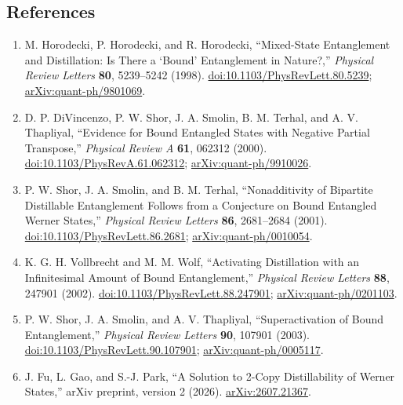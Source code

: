 \subsection*{References}

\begin{enumerate}[label={},leftmargin=4.8em,labelsep=0.5em]
  \footnotesize
  \item[\textup{[HHH98]}]\label{ref:05aa-horodecki}
  M. Horodecki, P. Horodecki, and R. Horodecki, ``Mixed-State Entanglement and Distillation: Is There a `Bound' Entanglement in Nature?,'' \emph{Physical Review Letters} \textbf{80}, 5239--5242 (1998). \href{https://doi.org/10.1103/PhysRevLett.80.5239}{doi:10.1103/PhysRevLett.80.5239}; \href{https://arxiv.org/abs/quant-ph/9801069}{arXiv:quant-ph/9801069}.

  \item[\textup{[DSS+00]}]\label{ref:05aa-divincenzo-et-al}
  D. P. DiVincenzo, P. W. Shor, J. A. Smolin, B. M. Terhal, and A. V. Thapliyal, ``Evidence for Bound Entangled States with Negative Partial Transpose,'' \emph{Physical Review A} \textbf{61}, 062312 (2000). \href{https://doi.org/10.1103/PhysRevA.61.062312}{doi:10.1103/PhysRevA.61.062312}; \href{https://arxiv.org/abs/quant-ph/9910026}{arXiv:quant-ph/9910026}.

  \item[\textup{[SST01]}]\label{ref:05aa-shor-smolin-terhal}
  P. W. Shor, J. A. Smolin, and B. M. Terhal, ``Nonadditivity of Bipartite Distillable Entanglement Follows from a Conjecture on Bound Entangled Werner States,'' \emph{Physical Review Letters} \textbf{86}, 2681--2684 (2001). \href{https://doi.org/10.1103/PhysRevLett.86.2681}{doi:10.1103/PhysRevLett.86.2681}; \href{https://arxiv.org/abs/quant-ph/0010054}{arXiv:quant-ph/0010054}.

  \item[\textup{[VW02]}]\label{ref:05aa-vollbrecht-wolf}
  K. G. H. Vollbrecht and M. M. Wolf, ``Activating Distillation with an Infinitesimal Amount of Bound Entanglement,'' \emph{Physical Review Letters} \textbf{88}, 247901 (2002). \href{https://doi.org/10.1103/PhysRevLett.88.247901}{doi:10.1103/PhysRevLett.88.247901}; \href{https://arxiv.org/abs/quant-ph/0201103}{arXiv:quant-ph/0201103}.

  \item[\textup{[SST03]}]\label{ref:05aa-shor-smolin-thapliyal}
  P. W. Shor, J. A. Smolin, and A. V. Thapliyal, ``Superactivation of Bound Entanglement,'' \emph{Physical Review Letters} \textbf{90}, 107901 (2003). \href{https://doi.org/10.1103/PhysRevLett.90.107901}{doi:10.1103/PhysRevLett.90.107901}; \href{https://arxiv.org/abs/quant-ph/0005117}{arXiv:quant-ph/0005117}.

  \item[\textup{[FGP26]}]\label{ref:05aa-fu-gao-park}
  J. Fu, L. Gao, and S.-J. Park, ``A Solution to 2-Copy Distillability of Werner States,'' arXiv preprint, version 2 (2026). \href{https://arxiv.org/abs/2607.21367}{arXiv:2607.21367}.
\end{enumerate}

